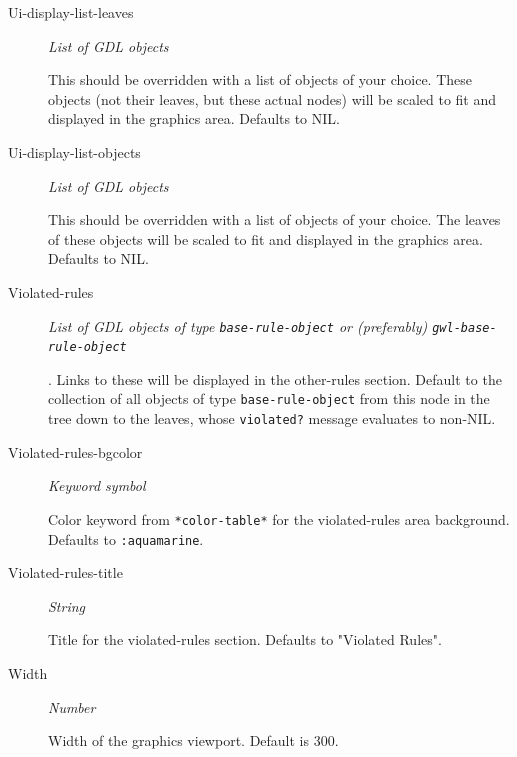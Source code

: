 \documentclass [11pt]{book}
\begin{document}
\begin{itemize}
\begin{description}
\item [Ui-display-list-leaves]
\emph{List of GDL objects}

 This should be overridden with a list of objects of your choice. These objects (not their leaves,
but these actual nodes) will be scaled to fit and displayed in the graphics area. Defaults to NIL.




\item [Ui-display-list-objects]
\emph{List of GDL objects}

 This should be overridden with a list of objects of your choice. The leaves of these objects will
be scaled to fit and displayed in the graphics area. Defaults to NIL.




\item [Violated-rules]
\emph{List of GDL objects of type \texttt{base-rule-object} or (preferably) \texttt{gwl-base-rule-object}}

.
Links to these will be displayed in the other-rules section. Default to the collection of all objects of type
\texttt{base-rule-object} from this node in the tree down to the leaves, whose \texttt{violated?} message
evaluates to non-NIL.




\item [Violated-rules-bgcolor]
\emph{Keyword symbol}

 Color keyword from \texttt{*color-table*} for the violated-rules area background. Defaults to \texttt{:aquamarine}.




\item [Violated-rules-title]
\emph{String}

 Title for the violated-rules section. Defaults to "Violated Rules".




\item [Width]
\emph{Number}

 Width of the graphics viewport. Default is 300.




\end{description}







\end{itemize}
\end{document}
